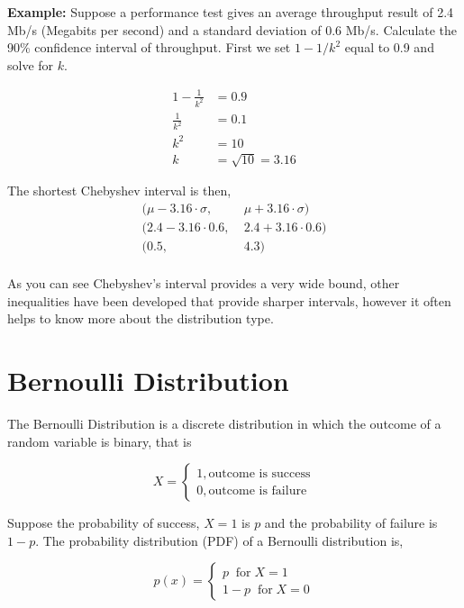 \textbf{Example:} Suppose a performance test gives an average throughput result of 2.4 Mb/s (Megabits per second) and a standard deviation of 0.6 Mb/s.
Calculate the 90\% confidence interval of throughput.\newline
First we set $1-1/k^2$ equal to 0.9 and solve for $k$.

\begin{align*}
	1 - \frac{1}{k^2} & = 0.9 \\
	\frac{1}{k^2} & = 0.1 \\
	k^2 & = 10 \\
	k & = \sqrt{10} = 3.16
\end{align*}

The shortest Chebyshev interval is then,
\begin{align*}
	(\mu - 3.16\cdot \sigma, & \; \mu + 3.16\cdot \sigma) \\
	(2.4 - 3.16\cdot 0.6, & \; 2.4 + 3.16\cdot 0.6) \\
	(0.5, & \; 4.3) \\
\end{align*}

As you can see Chebyshev's interval provides a very wide bound, other inequalities have been developed that provide sharper intervals, however it often helps
to know more about the distribution type.

\section{Bernoulli Distribution}
The Bernoulli Distribution is a discrete distribution in which the outcome of a random variable is binary, that is

\begin{equation*}
    X = \left\{\begin{matrix}
	    1, \textrm{outcome is success}\\ 0, \textrm{outcome is failure}
    \end{matrix}\right.
\end{equation*}

Suppose the probability of success, $X=1$ is $p$ and the probability of failure is $1-p$. The probability distribution (PDF) of a Bernoulli distribution is,

\begin{equation*}
	p(x) = \left\{\begin{matrix}
		p \; \; \textrm{for} \; X = 1 \\ 1-p \; \; \textrm{for} \; X = 0
	\end{matrix}\right.
\end{equation*}

